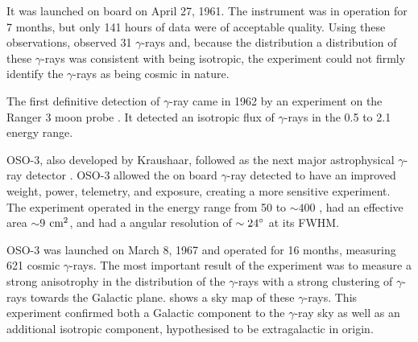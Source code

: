 It was launched on board \explorerxi on April 27,
1961. The instrument was in operation for 7 months, but only 141 hours
of data were of acceptable quality.  Using these observations, \explorerxi
observed 31 $\gamma$-rays and, because the distribution a distribution of
these $\gamma$-rays was consistent with being isotropic, the experiment
could not firmly identify the $\gamma$-rays as being cosmic in nature.





The first definitive detection of $\gamma$-ray came in
1962 by an experiment on the Ranger 3 moon
probe \citep{arnold_1962_gamma-space}.  It detected an isotropic flux
of $\gamma$-rays in the 0.5 \mev to 2.1 \mev energy range.

\Ac{OSO-3}, also developed by Kraushaar, followed \explorerxi
as the next major astrophysical $\gamma$-ray detector
\cite{kraushaar_1972_high-energy-cosmic}.  \Ac{OSO-3} 
allowed the on board $\gamma$-ray detected to have an improved weight,
power, telemetry, and exposure, creating a more sensitive experiment.
The experiment operated in the energy range from 50 \mev to $\sim 400$
\mev, had an effective area $\sim 9$ $\text{cm}^2$, and had a angular resolution of
$\sim 24^\circ$ at its \ac{FWHM}.

\Ac{OSO-3} was launched on March 8, 1967 and operated for 16 months, measuring
621 cosmic $\gamma$-rays.  The most important result of the experiment was
to measure a strong anisotrophy in the distribution of the $\gamma$-rays
with a strong clustering of $\gamma$-rays towards the Galactic plane.
 shows a sky map of these $\gamma$-rays.  This
experiment confirmed both a Galactic component to the $\gamma$-ray
sky as well as an additional isotropic component, hypothesised to be
extragalactic in origin.

